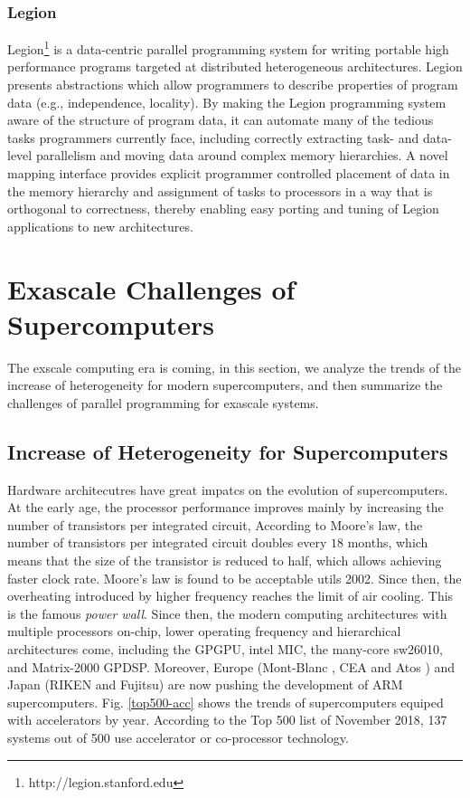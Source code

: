 \subsubsection{Legion}

Legion\footnote{http://legion.stanford.edu} \cite{grimshaw1994synopsis} is a data-centric parallel programming system for writing portable high performance programs targeted at distributed heterogeneous architectures. Legion presents abstractions which allow programmers to describe properties of program data (e.g., independence, locality). By making the Legion programming system aware of the structure of program data, it can automate many of the tedious tasks programmers currently face, including correctly extracting task- and data-level parallelism and moving data around complex memory hierarchies. A novel mapping interface provides explicit programmer controlled placement of data in the memory hierarchy and assignment of tasks to processors in a way that is orthogonal to correctness, thereby enabling easy porting and tuning of Legion applications to new architectures.


\section{Exascale Challenges of Supercomputers}\label{Exascale Challenges of Supercomputers}

The exscale computing era is coming, in this section, we analyze the trends of the increase of heterogeneity for modern supercomputers, and then summarize the challenges of parallel programming for exascale systems.

\subsection{Increase of Heterogeneity for Supercomputers} \label{Trends of Heterogeneity}

Hardware architecutres have great impatcs on the evolution of supercomputers. At the early age, the processor performance improves mainly by increasing the number of transistors per integrated circuit, According to Moore's law, the number of transistors per integrated circuit doubles every $18$ months, which means that the size of the transistor is reduced to half, which allows achieving faster clock rate. Moore's law is found to be acceptable utils 2002. Since then, the overheating introduced by higher frequency reaches the limit of air cooling. This is the famous \textit{power wall}. Since then, the modern computing architectures with multiple processors on-chip, lower operating frequency and hierarchical architectures come, including the GPGPU, intel MIC, the many-core sw26010, and Matrix-2000 GPDSP. Moreover, Europe (Mont-Blanc \cite{rajovic2016mont}, CEA and Atos \cite{ceaarm}) and Japan (RIKEN and Fujitsu) \cite{japanarm} are now pushing the development of ARM supercomputers. Fig. \ref{top500-acc} shows the trends of supercomputers equiped with accelerators by year. According to the Top 500 list of November 2018, 137 systems out of 500 use accelerator or co-processor technology.

